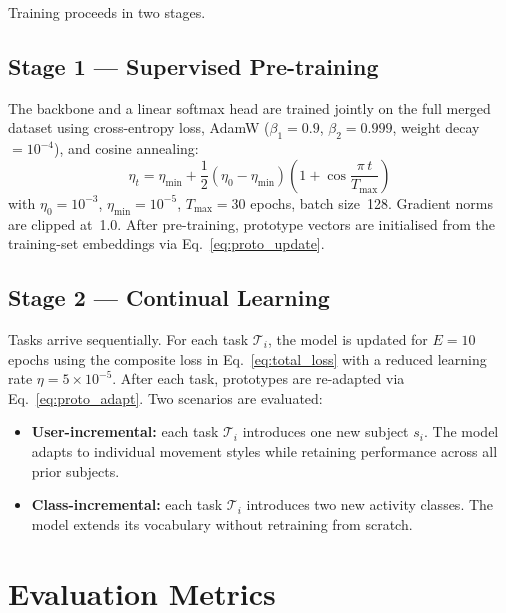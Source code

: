 Training proceeds in two stages.

\subsection{Stage 1 --- Supervised Pre-training}

The backbone and a linear softmax head are trained jointly on the full
merged dataset using cross-entropy loss, AdamW
\cite{loshchilov2019adamw} ($\beta_1 = 0.9$, $\beta_2 = 0.999$,
weight decay $= 10^{-4}$), and cosine annealing:
\begin{equation}
    \eta_t = \eta_{\min} + \frac{1}{2}\left(\eta_0 - \eta_{\min}\right)
    \left(1 + \cos\frac{\pi\,t}{T_{\max}}\right)
    \label{eq:cosine_lr}
\end{equation}
with $\eta_0 = 10^{-3}$, $\eta_{\min} = 10^{-5}$, $T_{\max} = 30$ epochs,
batch size~128. Gradient norms are clipped at~1.0. After pre-training,
prototype vectors are initialised from the training-set embeddings via
Eq.~\eqref{eq:proto_update}.

\subsection{Stage 2 --- Continual Learning}

Tasks arrive sequentially. For each task $\mathcal{T}_i$, the model is
updated for $E = 10$ epochs using the composite loss in
Eq.~\eqref{eq:total_loss} with a reduced learning rate
$\eta = 5 \times 10^{-5}$. After each task, prototypes are re-adapted via
Eq.~\eqref{eq:proto_adapt}. Two scenarios are evaluated:

\begin{itemize}
    \item \textbf{User-incremental:} each task $\mathcal{T}_i$ introduces
    one new subject $s_i$. The model adapts to individual movement styles
    while retaining performance across all prior subjects.

    \item \textbf{Class-incremental:} each task $\mathcal{T}_i$ introduces
    two new activity classes. The model extends its vocabulary without
    retraining from scratch.
\end{itemize}


\section{Evaluation Metrics}

